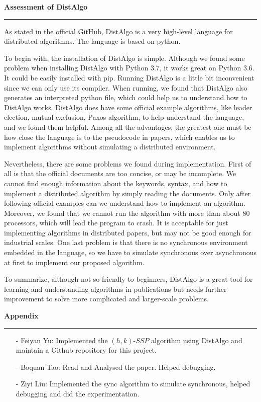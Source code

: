 \documentclass[11pt]{article}  %
\begin{document}
{\bf Assessment of DistAlgo}

\rule{6in}{.1pt}       %

As stated in the official GitHub, DistAlgo is a very high-level language for distributed algorithms. The language is based on python.\par
To begin with, the installation of DistAlgo is simple. Although we found some problem when installing DistAlgo with Python 3.7, it works great on Python 3.6. It could be easily installed with pip. Running DistAlgo is a little bit inconvenient since we can only use its compiler. When running, we found that DistAlgo also generates an interpreted python file, which could help us to understand how to DistAlgo works. DistAlgo does have some official example algorithms, like leader election, mutual exclusion, Paxos algorithm, to help understand the language, and we found them helpful. Among all the advantages, the greatest one must be how close the language is to the pseudocode in papers, which enables us to implement algorithms without simulating a distributed environment.\par
Nevertheless, there are some problems we found during implementation. First of all is that the official documents are too concise, or may be incomplete. We cannot find enough information about the keywords, syntax, and how to implement a distributed algorithm by simply reading the documents. Only after following official examples can we understand how to implement an algorithm. Moreover, we found that we cannot run the algorithm with more than about 80 processors, which will lead the program to crash. It is acceptable for just implementing algorithms in distributed papers, but may not be good enough for industrial scales. One last problem is that there is no synchronous environment embedded in the language, so we have to simulate synchronous over asynchronous at first to implement our proposed algorithm.\par
To summarize, although not so friendly to beginners, DistAlgo is a great tool for learning and understanding algorithms in publications but needs further improvement to solve more complicated and larger-scale problems.\par
\newpage
{\bf Appendix}

\rule{6in}{.1pt}       %

\begin{enumerate}
    \item[-]Feiyan Yu: Implemented the $(h,k)$-$SSP$ algorithm using DistAlgo and maintain a Github repository for this project.
	\item[-]Boquan Tao: Read and Analysed the paper. Helped debugging.
	\item[-]Ziyi Liu: Implemented the sync algorithm to simulate synchronous, helped debugging and did the experimentation.
\end{enumerate}
\end{document}
